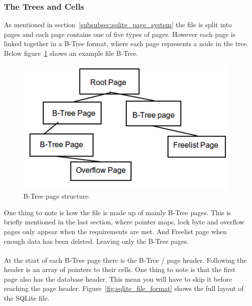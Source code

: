 \subsubsection{The Trees and Cells}
\label{subsubsec:sqlite_trees_and_cells}

As mentioned in section~\ref{subsubsec:sqlite_page_system} the file is split into pages and each page contains one of five types of pages. However each page is linked together in a B-Tree format, where each page represents a node in the tree. Below figure~\ref{fig:sqlite_btree_figure} shows an example file B-Tree.

\begin{figure}[H]
	\centering
	\includegraphics[scale=0.5]{images/sqlite_btree_format.png}
	\caption{B-Tree page structure.}
	\label{fig:sqlite_btree_figure}
\end{figure}

One thing to note is how the file is made up of mainly B-Tree pages. This is briefly mentioned in the last section, where pointer maps, lock byte and overflow pages only appear when the requirements are met. And Freelist page when enough data has been deleted. Leaving only the B-Tree pages.
\\\\
At the start of each B-Tree page there is the B-Tree / page header. Following the header is an array of pointers to their cells. One thing to note is that the first page also has the database header. This mean you will have to skip it before reaching the page header. Figure~\ref{fig:sqlite_file_format} shows the full layout of the SQLite file.

